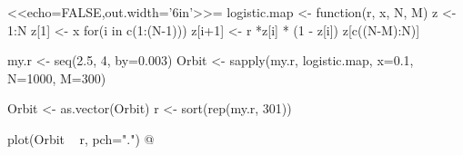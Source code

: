 \documentclass{standalone}
\begin{document}

<<echo=FALSE,out.width='6in'>>=
logistic.map <- function(r, x, N, M){
  z <- 1:N
  z[1] <- x
  for(i in c(1:(N-1))){
    z[i+1] <- r *z[i]  * (1 - z[i])
  }
  z[c((N-M):N)]
}

my.r <- seq(2.5, 4, by=0.003)
Orbit <- sapply(my.r, logistic.map,  x=0.1, N=1000, M=300)

Orbit <- as.vector(Orbit)
r <- sort(rep(my.r, 301))

plot(Orbit ~ r, pch=".")
@
\end{document}
